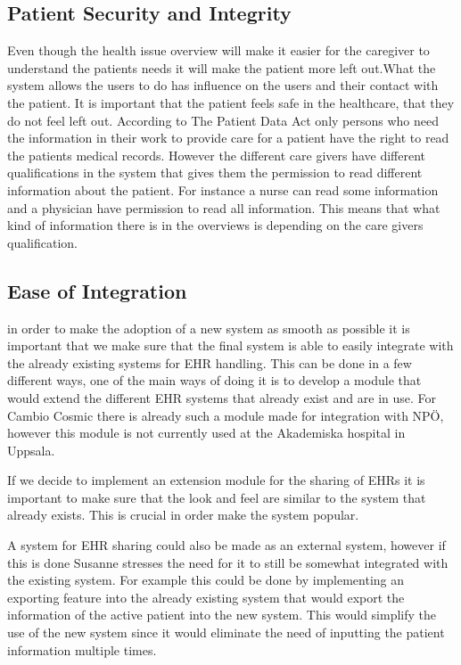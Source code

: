 \documentclass[14pt]{article}
\begin{document}
\subsection{Patient Security and Integrity}
Even though the health issue overview will make it easier for the caregiver to understand the patients needs it will make the patient more left out.What the system allows the users to do has influence on the users and their contact with the patient. It is important that the patient feels safe in the healthcare, that they do not feel left out. According to The Patient Data Act only persons who need the information in their work to provide care for a patient have the right to read the patients medical records. However the different care givers have different qualifications in the system that gives them the permission to read different information about the patient. For instance a nurse can read some information and a physician have permission to read all information. This means that what kind of information there is in the overviews is depending on the care givers qualification.

\subsection{Ease of Integration}
in order to make the adoption of a new system as smooth as possible it is important that we make sure that the final system is able to easily integrate with the already existing systems for \gls{EHR} handling. This can be done in a few different ways, one of the main ways of doing it is to develop a module that would extend the different \gls{EHR} systems that already exist and are in use.\cite{EPJ2} For Cambio Cosmic there is already such a module made for integration with NPÖ, however this module is not currently used at the Akademiska hospital in Uppsala\cite{EPJ1}.

If we decide to implement an extension module for the sharing of \glspl{EHR} it is important to make sure that the look and feel are similar to the system that already exists. This is crucial in order make the system popular. 

A system for \gls{EHR} sharing could also be made as an external system, however if this is done Susanne stresses the need for it to still be somewhat integrated with the existing system. For example this could be done by implementing an exporting feature into the already existing system that would export the information of the active patient into the new system. This would simplify the use of the new system since it would eliminate the need of inputting the patient information multiple times.
\end{document}
